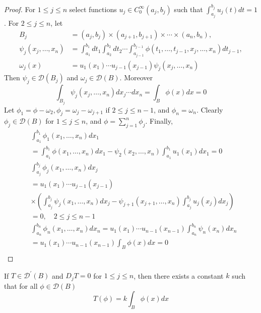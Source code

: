 \begin{proof}
  For $1 \leq j \leq n$ select functions $u_j \in C_0^{\infty}\left(a_j, b_j\right)$ such that $\int_{a_j}^{b_j} u_j(t) d t=1$. For $2 \leq j \leq n$, let
  \[
  \begin{aligned}
  B_j & =\left(a_j, b_j\right) \times\left(a_{j+1}, b_{j+1}\right) \times \cdots \times\left(a_n, b_n\right), \\
  \psi_j\left(x_j, \ldots, x_n\right) & =\int_{a_1}^{b_1} d t_1 \int_{a_2}^{b_2} d t_2 \cdots \int_{a_{j-1}}^{b_{j-1}} \phi\left(t_1, \ldots, t_{j-1}, x_j, \ldots, x_n\right) d t_{j-1}, \\
  \omega_j(x) & =u_1\left(x_1\right) \cdots u_{j-1}\left(x_{j-1}\right) \psi_j\left(x_j, \ldots, x_n\right)
  \end{aligned}
  \]
  Then $\psi_j \in \mathscr{D}\left(B_j\right)$ and $\omega_j \in \mathscr{D}(B)$. Moreover
  \[
  \int_{B_j} \psi_j\left(x_j, \ldots, x_n\right) d x_j \cdots d x_n=\int_B \phi(x) d x=0
  \]
  Let $\phi_1=\phi-\omega_2, \phi_j=\omega_j-\omega_{j+1}$ if $2 \leq j \leq n-1$, and $\phi_n=\omega_n$. Clearly $\phi_j \in \mathscr{D}(B)$ for $1 \leq j \leq n$, and $\phi=\sum_{j=1}^n \phi_j$. Finally,
  \[
  \begin{aligned}
  & \int_{a_1}^{b_1} \phi_1\left(x_1, \ldots, x_n\right) d x_1 \\
  & =\int_{a_1}^{b_1} \phi\left(x_1, \ldots, x_n\right) d x_1-\psi_2\left(x_2, \ldots, x_n\right) \int_{a_1}^{b_1} u_1\left(x_1\right) d x_1=0 \\
  & \int_{a_j}^{b_j} \phi_j\left(x_1, \ldots, x_n\right) d x_j \\
  & =u_1\left(x_1\right) \cdots u_{j-1}\left(x_{j-1}\right) \\
  & \times\left(\int_{a_j}^{b_j} \psi_j\left(x_1, \ldots, x_n\right) d x_j-\psi_{j+1}\left(x_{j+1}, \ldots, x_n\right) \int_{a_j}^{b_j} u_j\left(x_j\right) d x_j\right) \\
  & =0, \quad 2 \leq j \leq n-1 \\
  & \int_{a_n}^{b_n} \phi_n\left(x_1, \ldots, x_n\right) d x_n=u_1\left(x_1\right) \cdots u_{n-1}\left(x_{n-1}\right) \int_{a_n}^{b_n} \psi_n\left(x_n\right) d x_n \\
  & =u_1\left(x_1\right) \cdots u_{n-1}\left(x_{n-1}\right) \int_B \phi(x) d x=0 \\
  &
  \end{aligned}
  \]
\end{proof}


\begin{corollary}
  If $T \in \mathscr{D}^{\prime}(B)$ and $D_j T=0$ for $1 \leq j \leq n$, then there exists a constant $k$ such that for all $\phi \in \mathscr{D}(B)$
  \[
  T(\phi)=k \int_B \phi(x) d x
  \]
\end{corollary}

